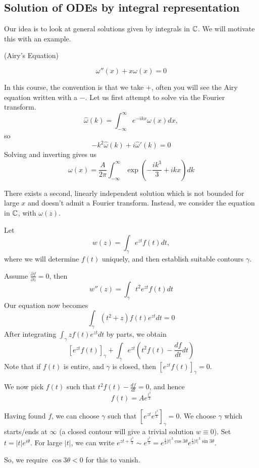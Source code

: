 \documentclass[a4paper]{article}
\begin{document}
\subsection{Solution of ODEs by integral representation}

Our idea is to look at general solutions given by integrals in $\mathbb{C}$. We will motivate this with an example.

\begin{eg} (Airy's Equation)

	\[
		\omega''(x) + x\omega(x) = 0
	\] 
	
	In this course, the convention is that we take $+$, often you will see the Airy equation written with a $-$. Let us first attempt to solve via the Fourier transform.
	\[
		\hat{\omega}(k) = \int_{-\infty}^{\infty} e^{-ikx}\omega(x) dx,
	\] 
	so
	\[
		-k^2 \hat{\omega}(k) + i \hat{\omega}'(k) = 0
	\] 
	Solving and inverting gives us
	\[
		\omega(x) = \frac{A}{2\pi} \int_{-\infty}^{\infty} \exp\left(-\frac{ik^3}{3} + ikx  \right) dk 
	\] 

	There exists a second, linearly independent solution which is not bounded for large $x$ and doesn't admit a Fourier transform. Instead, we consider the equation in $\mathbb{C}$, with $\omega(z)$.

	Let
	 \[
		 w(z) = \int_{\gamma} e^{zt}f(t)dt
	,\] 
	where we will determine $f(t)$ uniquely, and then establish suitable contours $\gamma$.

	Assume  $\frac{\partial f}{\partial z} =0$, then
	\[
		w''(z) = \int_{\gamma} t^2 e^{zt} f(t) dt
	\] 
	Our equation now becomes
	\[
		\int_{\gamma} (t^2 + z) f(t) e^{zt} dt = 0
	\]
	After integrating $\int_{\gamma} zf(t)e^{zt}dt$ by parts, we obtain
	\[
		\left[ e^{zt}f(t) \right]_{\gamma} + \int_{\gamma} e^{zt} \left( t^2f(t) - \frac{df}{dt} dt \right)  
	\] 
	Note that if  $f(t)$ is entire, and $\gamma$ is closed, then $\left[ e^{zt}f(t) \right]_{\gamma} = 0$.

	We now pick $f(t)$ such that $t^2f(t) - \frac{df}{dt} = 0$, and hence
	\[
		f(t) = Ae^{\frac{t^3}{3}}
	\]

	Having found $f$, we can choose $\gamma$ such that $\left[ e^{zt}e^{\frac{t^3}{3}} \right]_{\gamma} = 0$. We choose $\gamma$ which starts/ends at $\infty$ (a closed contour will give a trivial solution $w \equiv 0$). Set $t = |t| e^{i\theta}$. For large $|t|$, we can write  $e^{zt + \frac{t^3}{3}} \sim e^{\frac{t^3}{3}} = e^{\frac{1}{3}|t|^3\cos 3\theta}e^{\frac{i}{3}|t|^3\sin 3\theta}$.

	So, we require $\cos 3\theta < 0$ for this to vanish.


\end{eg}
\end{document}

